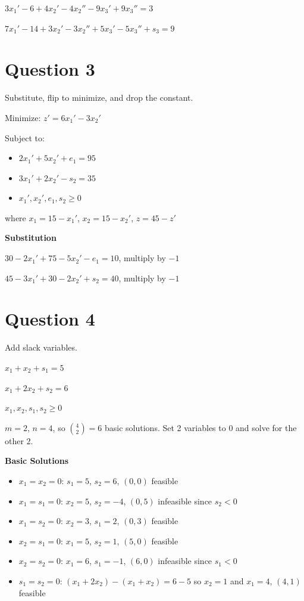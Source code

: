 \documentclass{article}
\begin{document}
$3x_1' - 6 + 4x_2' - 4x_2'' - 9x_3' + 9x_3'' = 3$

$7x_1' - 14 + 3x_2' - 3x_2'' + 5x_3' - 5x_3'' + s_3 = 9$

\section*{Question 3}
Substitute, flip to minimize, and drop the constant.

Minimize: $z' = 6x_1' - 3x_2'$

Subject to:
\begin{itemize}
    \item $2x_1' + 5x_2' + e_1 = 95$
    \item $3x_1' + 2x_2' - s_2 = 35$
    \item $x_1', x_2', e_1, s_2 \ge 0$
\end{itemize}

where $x_1 = 15 - x_1'$, $x_2 = 15 - x_2'$, $z = 45 - z'$

\textbf{Substitution}

$30 - 2x_1' + 75 - 5x_2' - e_1 = 10$, multiply by $-1$

$45 - 3x_1' + 30 - 2x_2' + s_2 = 40$, multiply by $-1$

\section*{Question 4}
Add slack variables.

$x_1 + x_2 + s_1 = 5$

$x_1 + 2x_2 + s_2 = 6$

$x_1, x_2, s_1, s_2 \ge 0$

$m = 2$, $n = 4$, so $\binom{4}{2} = 6$ basic solutions. Set 2 variables to 0 and solve for the other 2.

\textbf{Basic Solutions}
\begin{itemize}
    \item $x_1 = x_2 = 0$: $s_1 = 5$, $s_2 = 6$, $(0,0)$ feasible
    \item $x_1 = s_1 = 0$: $x_2 = 5$, $s_2 = -4$, $(0,5)$ infeasible since $s_2 < 0$
    \item $x_1 = s_2 = 0$: $x_2 = 3$, $s_1 = 2$, $(0,3)$ feasible
    \item $x_2 = s_1 = 0$: $x_1 = 5$, $s_2 = 1$, $(5,0)$ feasible
    \item $x_2 = s_2 = 0$: $x_1 = 6$, $s_1 = -1$, $(6,0)$ infeasible since $s_1 < 0$
    \item $s_1 = s_2 = 0$: $(x_1 + 2x_2) - (x_1 + x_2) = 6 - 5$ so $x_2 = 1$ and $x_1 = 4$, $(4,1)$ feasible
\end{itemize}
\end{document}
